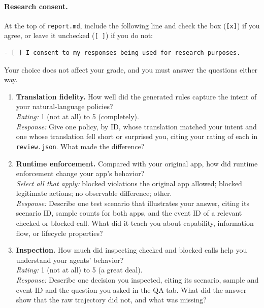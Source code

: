 \documentclass[10pt,letterpaper]{article}
\begin{document}
\paragraph{Research consent.} At the top of \texttt{report.md}, include the
following line and check the box (\texttt{[x]}) if you agree, or leave it
unchecked (\texttt{[ ]}) if you do not:
\begin{lstlisting}
- [ ] I consent to my responses being used for research purposes.
\end{lstlisting}
Your choice does not affect your grade, and you must answer the questions
either way.

\begin{enumerate}
\item \textbf{Translation fidelity.} How well did the generated rules capture
the intent of your natural-language policies?\\
\emph{Rating:} 1 (not at all) to 5 (completely).\\
\emph{Response:} Give one policy, by ID, whose translation matched your intent
and one whose translation fell short or surprised you, citing your rating of
each in \texttt{review.json}. What made the difference?

\item \textbf{Runtime enforcement.} Compared with your original app, how did
runtime enforcement change your app's behavior?\\
\emph{Select all that apply:} blocked violations the original app allowed; blocked
legitimate actions; no observable difference; other.\\
\emph{Response:} Describe one test scenario that illustrates your answer,
citing its scenario ID, sample counts for both apps, and the event ID of a
relevant checked or blocked call. What did it teach you about capability,
information flow, or lifecycle properties?

\item \textbf{Inspection.} How much did inspecting checked and blocked calls
help you understand your agents' behavior?\\
\emph{Rating:} 1 (not at all) to 5 (a great deal).\\
\emph{Response:} Describe one decision you inspected, citing its scenario,
sample and event ID and the question you asked in the QA tab. What did the
answer show that the raw trajectory did not, and what was missing?
\end{enumerate}

\appendix
\clearpage
\end{document}
